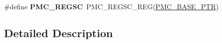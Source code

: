 \begin{DoxyCompactItemize}
\item 
\hypertarget{group___p_m_c___register___accessor___macros_gad80edb8f69da1769b7367108d8c4f9be}{}\#define {\bfseries P\+M\+C\+\_\+\+R\+E\+G\+S\+C}~P\+M\+C\+\_\+\+R\+E\+G\+S\+C\+\_\+\+R\+E\+G(\hyperlink{group___p_m_c___peripheral_gaf32df9f1096263f10a5e8978a338b2ac}{P\+M\+C\+\_\+\+B\+A\+S\+E\+\_\+\+P\+T\+R})\label{group___p_m_c___register___accessor___macros_gad80edb8f69da1769b7367108d8c4f9be}

\end{DoxyCompactItemize}


\subsection{Detailed Description}
